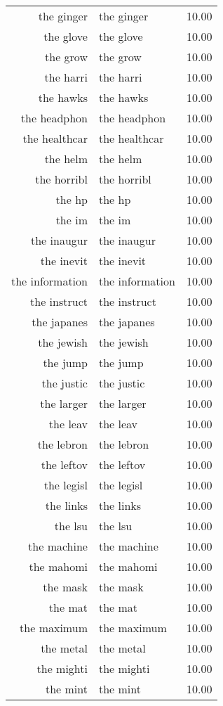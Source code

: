 \begin{table}[ht]
\begin{tabular}{rlr}
  the ginger & the ginger & 10.00 \\ 
  the glove & the glove & 10.00 \\ 
  the grow & the grow & 10.00 \\ 
  the harri & the harri & 10.00 \\ 
  the hawks & the hawks & 10.00 \\ 
  the headphon & the headphon & 10.00 \\ 
  the healthcar & the healthcar & 10.00 \\ 
  the helm & the helm & 10.00 \\ 
  the horribl & the horribl & 10.00 \\ 
  the hp & the hp & 10.00 \\ 
  the im & the im & 10.00 \\ 
  the inaugur & the inaugur & 10.00 \\ 
  the inevit & the inevit & 10.00 \\ 
  the information & the information & 10.00 \\ 
  the instruct & the instruct & 10.00 \\ 
  the japanes & the japanes & 10.00 \\ 
  the jewish & the jewish & 10.00 \\ 
  the jump & the jump & 10.00 \\ 
  the justic & the justic & 10.00 \\ 
  the larger & the larger & 10.00 \\ 
  the leav & the leav & 10.00 \\ 
  the lebron & the lebron & 10.00 \\ 
  the leftov & the leftov & 10.00 \\ 
  the legisl & the legisl & 10.00 \\ 
  the links & the links & 10.00 \\ 
  the lsu & the lsu & 10.00 \\ 
  the machine & the machine & 10.00 \\ 
  the mahomi & the mahomi & 10.00 \\ 
  the mask & the mask & 10.00 \\ 
  the mat & the mat & 10.00 \\ 
  the maximum & the maximum & 10.00 \\ 
  the metal & the metal & 10.00 \\ 
  the mighti & the mighti & 10.00 \\ 
  the mint & the mint & 10.00 \\ 

\end{tabular}
\end{table}
